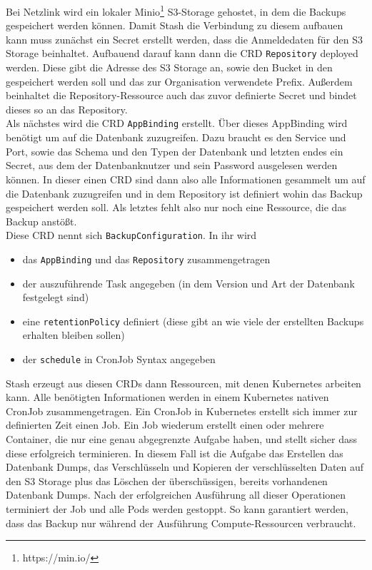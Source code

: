 Bei Netzlink wird ein lokaler Minio\footnote{https://min.io/} \ac{S3}-Storage gehostet, in dem die Backups gespeichert werden können.
Damit Stash die Verbindung zu diesem aufbauen kann muss zunächst ein Secret erstellt werden, dass die Anmeldedaten für den \ac{S3} Storage beinhaltet.
Aufbauend darauf kann dann die \ac{CRD} \texttt{Repository} deployed werden. 
Diese gibt die Adresse des \ac{S3} Storage an, sowie den Bucket in den gespeichert werden soll und das zur Organisation verwendete Prefix.
Außerdem beinhaltet die Repository-Ressource auch das zuvor definierte Secret und bindet dieses so an das Repository.
\\
Als nächstes wird die \ac{CRD} \texttt{AppBinding} erstellt. 
Über dieses AppBinding wird benötigt um auf die Datenbank zuzugreifen. 
Dazu braucht es den Service und Port, sowie das Schema und den Typen der Datenbank und letzten endes ein Secret, aus dem der Datenbanknutzer und sein Password ausgelesen werden können.
In dieser einen \ac{CRD} sind dann also alle Informationen gesammelt um auf die Datenbank zuzugreifen und in dem Repository ist definiert wohin das Backup gespeichert werden soll.
Als letztes fehlt also nur noch eine Ressource, die das Backup anstößt.
\\
Diese \ac{CRD} nennt sich \texttt{BackupConfiguration}. 
In ihr wird 
\begin{itemize}
    \item das \texttt{AppBinding} und das \texttt{Repository} zusammengetragen
    \item der auszuführende Task angegeben (in dem Version und Art der Datenbank festgelegt sind)
    \item eine \texttt{retentionPolicy} definiert (diese gibt an wie viele der erstellten Backups erhalten bleiben sollen)
    \item der \texttt{schedule} in CronJob Syntax angegeben
\end{itemize}
Stash erzeugt aus diesen \ac{CRD}s dann Ressourcen, mit denen Kubernetes arbeiten kann.
Alle benötigten Informationen werden in einem Kubernetes nativen CronJob zusammengetragen.
Ein CronJob in Kubernetes erstellt sich immer zur definierten Zeit einen Job. 
Ein Job wiederum erstellt einen oder mehrere Container, die nur eine genau abgegrenzte Aufgabe haben, und stellt sicher dass diese erfolgreich terminieren. 
In diesem Fall ist die Aufgabe das Erstellen das Datenbank Dumps, das Verschlüsseln und Kopieren der verschlüsselten Daten auf den \ac{S3} Storage plus das Löschen der überschüssigen, bereits vorhandenen Datenbank Dumps.
Nach der erfolgreichen Ausführung all dieser Operationen terminiert der Job und alle Pods werden gestoppt. 
So kann garantiert werden, dass das Backup nur während der Ausführung Compute-Ressourcen verbraucht. 

